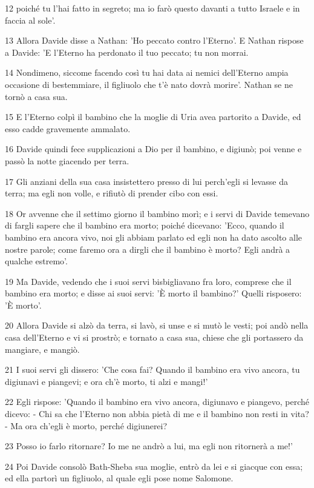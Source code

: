 \par 12 poiché tu l'hai fatto in segreto; ma io farò questo davanti a tutto Israele e in faccia al sole'.
\par 13 Allora Davide disse a Nathan: 'Ho peccato contro l'Eterno'. E Nathan rispose a Davide: 'E l'Eterno ha perdonato il tuo peccato; tu non morrai.
\par 14 Nondimeno, siccome facendo così tu hai data ai nemici dell'Eterno ampia occasione di bestemmiare, il figliuolo che t'è nato dovrà morire'. Nathan se ne tornò a casa sua.
\par 15 E l'Eterno colpì il bambino che la moglie di Uria avea partorito a Davide, ed esso cadde gravemente ammalato.
\par 16 Davide quindi fece supplicazioni a Dio per il bambino, e digiunò; poi venne e passò la notte giacendo per terra.
\par 17 Gli anziani della sua casa insistettero presso di lui perch'egli si levasse da terra; ma egli non volle, e rifiutò di prender cibo con essi.
\par 18 Or avvenne che il settimo giorno il bambino morì; e i servi di Davide temevano di fargli sapere che il bambino era morto; poiché dicevano: 'Ecco, quando il bambino era ancora vivo, noi gli abbiam parlato ed egli non ha dato ascolto alle nostre parole; come faremo ora a dirgli che il bambino è morto? Egli andrà a qualche estremo'.
\par 19 Ma Davide, vedendo che i suoi servi bisbigliavano fra loro, comprese che il bambino era morto; e disse ai suoi servi: 'È morto il bambino?' Quelli risposero: 'È morto'.
\par 20 Allora Davide si alzò da terra, si lavò, si unse e si mutò le vesti; poi andò nella casa dell'Eterno e vi si prostrò; e tornato a casa sua, chiese che gli portassero da mangiare, e mangiò.
\par 21 I suoi servi gli dissero: 'Che cosa fai? Quando il bambino era vivo ancora, tu digiunavi e piangevi; e ora ch'è morto, ti alzi e mangi!'
\par 22 Egli rispose: 'Quando il bambino era vivo ancora, digiunavo e piangevo, perché dicevo: - Chi sa che l'Eterno non abbia pietà di me e il bambino non resti in vita? - Ma ora ch'egli è morto, perché digiunerei?
\par 23 Posso io farlo ritornare? Io me ne andrò a lui, ma egli non ritornerà a me!'
\par 24 Poi Davide consolò Bath-Sheba sua moglie, entrò da lei e si giacque con essa; ed ella partorì un figliuolo, al quale egli pose nome Salomone.
